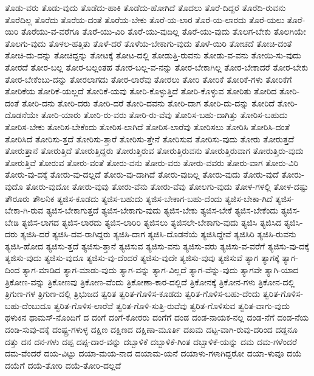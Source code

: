{ತೊಡು-ವರು
ತೊಡು-ವುದು
ತೊಡೆದು-ಹಾಕಿ
ತೊಡೆದು-ಹೋಗಿದೆ
ತೊದಲು
ತೊರೆ-ದಿದ್ದರೆ
ತೊರೆದಿ-ರುವನು
ತೊರೆದಿಲ್ಲ
ತೊರೆದು
ತೊರೆಯ-ದಂತೆ
ತೊರೆಯ-ಬೇಕು
ತೊರೆ-ಯ-ಲಾರ
ತೊರೆ-ಯ-ಲಾರದು
ತೊರೆ-ಯಲು
ತೊರೆ-ಯಿರಿ
ತೊರೆಯು-ವ-ವರೆಗೂ
ತೊರೆ-ಯು-ವಿರಿ
ತೊರೆ-ಯು-ವುದಿಲ್ಲ
ತೊರೆ-ಯು-ವುದು
ತೊಲಗ-ಬೇಕು
ತೊಲಗಿಯೇ
ತೊಲಗು-ವುದು
ತೊಳಲ-ಹತ್ತಿತು
ತೊಳೆ-ದರೆ
ತೊಳೆಯ-ಬೇಕಾಗು-ವುದು
ತೊಳೆ-ಯಿರಿ
ತೋಚದೆ
ತೋಚಿ-ದಂತೆ
ತೋಚಿ-ದು-ದನ್ನು
ತೋಚಿದ್ದನ್ನು
ತೋಟಕ್ಕೆ
ತೋಟ-ದಲ್ಲಿ
ತೋಡುತ್ತಿ-ರುವನು
ತೋಡು-ವ-ವನು
ತೋಯಿ-ಸು-ವುದು
ತೋರದೆ
ತೋರ-ಬಲ್ಲ
ತೋರ-ಬಲ್ಲಂತಹ
ತೋರ-ಬಲ್ಲ-ವ-ನನ್ನು
ತೋರ-ಬೇಕಾಗಿಲ್ಲ
ತೋರ-ಬೇಕಾದರೆ
ತೋರ-ಬೇಕು
ತೋರ-ಬೇಕೆಂಬು-ದನ್ನು
ತೋರಲಾಗದು
ತೋರ-ಲಾರೆವು
ತೋರಲು
ತೋರಿ
ತೋರಿಕೆ
ತೋರಿಕೆ-ಗಳು
ತೋರಿಕೆಗೆ
ತೋರಿಕೆಯ
ತೋರಿಕೆ-ಯಲ್ಲದೆ
ತೋರಿಕೆ-ಯವು
ತೋರಿ-ಕೊಳ್ಳುತ್ತಿದೆ
ತೋರಿ-ಕೊಳ್ಳುವ
ತೋರಿತು
ತೋರಿದ
ತೋರಿ-ದಂತೆ
ತೋರಿ-ದನು
ತೋರಿ-ದರು
ತೋರಿ-ದರೆ
ತೋರಿ-ದವನು
ತೋರಿ-ದಾಗ
ತೋರಿ-ದು-ದನ್ನು
ತೋರಿದೆ
ತೋರಿ-ದೊಡನೆಯೇ
ತೋರಿ-ಯಾರು
ತೋರಿ-ರು-ವರು
ತೋರಿ-ರು-ವೆವು
ತೋರಿಸ-ಬಹು-ದಾಗಿತ್ತು
ತೋರಿಸ-ಬಹುದು
ತೋರಿಸ-ಬೇಕು
ತೋರಿಸ-ಬೇಕೆಂದು
ತೋರಿಸ-ಲಾಗಿದೆ
ತೋರಿಸ-ಲಾರೆವು
ತೋರಿಸಲು
ತೋರಿಸಿ
ತೋರಿಸಿ-ದಂತೆ
ತೋರಿಸಿದೆ
ತೋರಿಸು-ತ್ತದೆ
ತೋರಿಸು-ತ್ತಾರೆ
ತೋರಿಸು-ತ್ತೇನೆ
ತೋರಿಸುವ
ತೋರಿಸು-ವುದು
ತೋರು
ತೋರುತ್ತದೆ
ತೋರುತ್ತಾನೆ
ತೋರುತ್ತಿದೆ
ತೋರುತ್ತಿದ್ದರು
ತೋರುತ್ತಿರುವ
ತೋರುತ್ತಿರುವನು
ತೋರುತ್ತಿರುವಾಗ
ತೋರುತ್ತಿರು-ವುದು
ತೋರುತ್ತಿವೆ
ತೋರುವ
ತೋರು-ವಂತೆ
ತೋರು-ವನು
ತೋರು-ವರು
ತೋರು-ವವರು
ತೋರು-ವಾಗ
ತೋರು-ವಿರಿ
ತೋರು-ವು-ದಕ್ಕೆ
ತೋರು-ವು-ದಲ್ಲದೆ
ತೋರು-ವು-ದಾಗಿದೆ
ತೋರು-ವುದಿಲ್ಲ
ತೋರು-ವುದು
ತೋರು-ವುದೆ
ತೋರು-ವುದೊ
ತೋರು-ವುದೋ
ತೋರು-ವುವು
ತೋರು-ವೆನು
ತೋರು-ವೆವು
ತೋಲಗು-ವುದು
ತೋಳ-ಗಳಲ್ಲಿ
ತೋಳ-ದಷ್ಟು
ತೌರೂರು
ತೌಲನಿಕ
ತ್ಯಜಿಸ-ಕೂಡದು
ತ್ಯಜಿಸ-ಬಹುದು
ತ್ಯಜಿಸ-ಬೇಕಾಗ-ಬಹು-ದೆಂದು
ತ್ಯಜಿಸ-ಬೇಕಾ-ಗಿದೆ
ತ್ಯಜಿಸ-ಬೇಕಾ-ಗಿ-ರುವ
ತ್ಯಜಿಸ-ಬೇಕಾಗುತ್ತದೆ
ತ್ಯಜಿಸ-ಬೇಕಾಗು-ವುದು
ತ್ಯಜಿಸ-ಬೇಕು
ತ್ಯಜಿಸ-ಬೇಕೆ
ತ್ಯಜಿಸ-ಬೇಕೆಂದು
ತ್ಯಜಿಸ-ಬೇಡಿ
ತ್ಯಜಿಸ-ಲಾಗದ
ತ್ಯಜಿಸ-ಲಾರದು
ತ್ಯಜಿಸ-ಲಾರಿರಿ
ತ್ಯಜಿಸಲು
ತ್ಯಜಿಸಲೇ-ಬೇಕಾಗು-ವುದು
ತ್ಯಜಿಸಿ
ತ್ಯಜಿಸಿದ
ತ್ಯಜಿಸಿ-ದರು
ತ್ಯಜಿಸಿ-ದರೆ
ತ್ಯಜಿಸಿ-ದವ-ರಾಗಿದ್ದರು
ತ್ಯಜಿಸಿ-ದಾಗ
ತ್ಯಜಿಸಿ-ದೊಡನೆಯೆ
ತ್ಯಜಿಸಿದ್ದೇವೆ
ತ್ಯಜಿಸಿರಿ
ತ್ಯಜಿಸಿ-ರುವನು
ತ್ಯಜಿಸಿ-ಹೋದ
ತ್ಯಜಿಸು-ತ್ತದೆ
ತ್ಯಜಿಸು-ತ್ತಾನೆ
ತ್ಯಜಿಸುವ
ತ್ಯಜಿಸು-ವನು
ತ್ಯಜಿಸು-ವರು
ತ್ಯಜಿಸು-ವ-ವರೆಗೆ
ತ್ಯಜಿಸು-ವು-ದಕ್ಕೆ
ತ್ಯಜಿಸು-ವುದು
ತ್ಯಜಿಸು-ವುದೂ
ತ್ಯಜಿಸು-ವು-ದೆಂದರೆ
ತ್ಯಜಿಸು-ವುದೇ
ತ್ಯಜಿಸು-ವುವು
ತ್ಯಜಿಸುವೆ
ತ್ಯಾಗ
ತ್ಯಾಗಕ್ಕೆ
ತ್ಯಾಗ-ದಿಂದ
ತ್ಯಾಗ-ಮಾಡಿದ
ತ್ಯಾಗ-ಮಾಡು-ವುದು
ತ್ಯಾಗ-ವನ್ನು
ತ್ಯಾಗ-ವಿಲ್ಲದೆ
ತ್ಯಾಗ-ವೆನ್ನು-ವುದು
ತ್ಯಾಗವೇ
ತ್ಯಾಗಿ-ಯಾದ
ತ್ರಿಕೋಣ-ವನ್ನು
ತ್ರಿಕೋಣವು
ತ್ರಿಕೋಣ-ವೆಂದು
ತ್ರಿಕೋಣಾ-ಕಾರ-ದಲ್ಲಿದೆ
ತ್ರಿಕೋನಕ್ಕೆ
ತ್ರಿಕೋನ-ಗಳು
ತ್ರಿಕೋನ-ದಲ್ಲಿ
ತ್ರಿಗುಣ-ಗಳ
ತ್ರಿಗುಣ-ದಲ್ಲಿ
ತ್ರಿಭುಜದ
ತ್ವರಿತ
ತ್ವರಿತ-ಗೊಳಿಸ-ಕೂಡದು
ತ್ವರಿತ-ಗೊಳಿಸ-ಬಹು-ದೆಂದು
ತ್ವರಿತ-ಗೊಳಿಸ-ಬಹು-ದೆಂಬುದೂ
ತ್ವರಿತ-ಗೊಳಿಸ-ಲಾರೆವೆ
ತ್ವರಿತ-ಗೊಳಿ-ಸುತ್ತಿ-ರುವೆವು
ತ್ವರಿತ-ಗೊಳಿಸುವ
ತ್ವರಿತ-ವಾಗು-ವುದು
ಥಳುಕಿನ
ಥಾಮಸ್-ನೊಂದಿಗೆ
ದ
ದಂಗೆ
ದಂಗೆ-ಕೋರರು
ದಂಗೆಗೆ
ದಂಡ
ದಂಡ-ನಾಯಕ-ನಲ್ಲ
ದಂಡ-ನೆಗೆ
ದಂಡ-ನೆಯ
ದಂಡಿ-ಸುವು-ದಕ್ಕೆ
ದಂಷ್ಟ್ರ-ಗಳುಳ್ಳ
ದಕ್ಷಿಣ
ದಕ್ಷಿಣದ
ದಕ್ಷಿಣಾ-ಮೂರ್ತಿ
ದಖಮ
ದಟ್ಟ-ವಾಗಿ-ರುವು-ದರಿಂದ
ದಡ್ಡನೂ
ದತ್ತು
ದನ
ದನ-ಗಳು
ದಪ್ಪ
ದಪ್ಪ-ದಾರ-ವನ್ನು
ದಬ್ಬಾಳಿಕೆ
ದಬ್ಬಾಳಿಕೆ-ಗಿಂತ
ದಬ್ಬಾಳಿಕೆ-ಯನ್ನು
ದಮ
ದಮ-ಗಳೆಂದರೆ
ದಮ-ವೆಂದರೆ
ದಯ-ವಿಟ್ಟು
ದಯಾ-ಮಯ-ನಾದ
ದಯಾಮ-ಯನೆ
ದಯಾಳು-ಗಳಾಗಿದ್ದರೋ
ದಯಾ-ಳುವೂ
ದಯೆ
ದಯೆಗೆ
ದಯೆ-ತೋರಿ
ದಯೆ-ತೋರಿ-ದಲ್ಲದೆ
}
